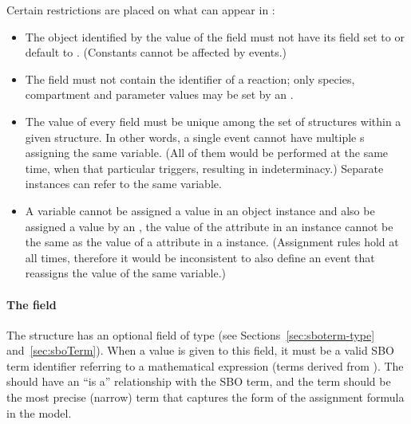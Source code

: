 Certain restrictions are placed on what can appear in
:
\begin{itemize}
  
\item The object identified by the value of the 
  field must not have its  field set to or default
  to .  (Constants cannot be affected by events.)
  
\item The  field must not contain the identifier
  of a reaction; only species, compartment and parameter values
  may be set by an \Event.
  
\item The value of every  field must be unique
  among the set of \EventAssignment structures within a given
  \Event structure.  In other words, a single event cannot have
  multiple \EventAssignment{}s assigning the same variable.  (All
  of them would be performed at the same time, when that
  particular \Event triggers, resulting in indeterminacy.)
  Separate \Event instances can refer to the same variable.
  
\item A variable cannot be assigned a value in an \EventAssignment
  object instance and also be assigned a value by an
  \AssignmentRule, \ie the value of the  attribute
  in an \EventAssignment instance cannot be the same as the value
  of a  attribute in a \AssignmentRule instance.
  (Assignment rules hold at all times, therefore it would be
  inconsistent to also define an event that reassigns the value of
  the same variable.)

\end{itemize}


\paragraph{The  field}

The \EventAssignment structure has an optional 
field of type  (see
Sections~\ref{sec:sboterm-type} and~\ref{sec:sboTerm}).  When a
value is given to this field, it must be a valid SBO term
identifier referring to a mathematical expression (\ie terms
derived from \sbomathformula).  The \EventAssignment should have
an ``is a'' relationship with the SBO term, and the term should be
the most precise (narrow) term that captures the form of the
assignment formula in the model.

